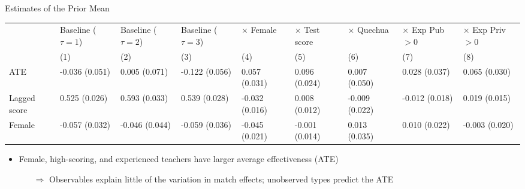 \documentclass[compress,10pt,aspectratio=169]{beamer}
\begin{document}
\begin{frame}{Estimates of the Prior Mean}
\begin{table}[t!]
\centering
\label{tva_estimates}
\begin{threeparttable}
\scriptsize
\renewcommand{\arraystretch}{1.3}
\begin{tabular}{L{1.5cm} *{8}{C{1cm}}}
  \hline
  \hline
 & Baseline ($\tau=1$) & Baseline ($\tau=2$) & Baseline ($\tau=3$) & $\times$ Female & $\times$ Test score & $\times$ Quechua & $\times$ Exp Pub $>0$ & $\times$ Exp Priv $>0$ \\
 & (1) & (2) & (3) & (4) & (5) & (6) & (7) & (8) \\
\hline
ATE & -0.036 (0.051) & 0.005  (0.071) & -0.122 (0.056) & 0.057  (0.031) & 0.096  (0.024) & 0.007  (0.050) & 0.028  (0.037) & 0.065 (0.030) \\
Lagged score & 0.525  (0.026) & 0.593  (0.033) & 0.539  (0.028) & -0.032 (0.016) & 0.008  (0.012) & -0.009 (0.022) & -0.012 (0.018) & 0.019 (0.015) \\
Female & -0.057 (0.032) & -0.046 (0.044) & -0.059 (0.036) & -0.045 (0.021) & -0.001 (0.014) & 0.013  (0.035) & 0.010  (0.022) & -0.003 (0.020) \\
   \hline
   \hline
\end{tabular}
\begin{tablenotes}
\scriptsize \item
\end{tablenotes}
    \end{threeparttable}
\end{table}
\begin{itemize}
    \item Female, high-scoring, and experienced teachers have larger average effectiveness (ATE)
    \begin{itemize}
    \smallskip
        \item[$\Rightarrow$] Observables explain little of the variation in match effects; unobserved types predict the ATE
    \end{itemize}
\end{itemize}
\end{frame}
\end{document}
